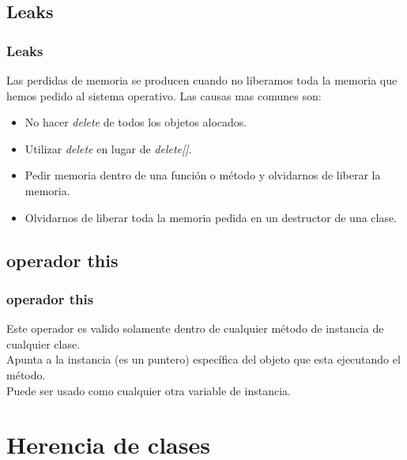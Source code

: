 \documentclass{beamer}
\begin{document}
\subsection{Leaks}
\begin{frame}
\frametitle{Leaks}

Las perdidas de memoria se producen cuando no liberamos toda la memoria que hemos pedido al sistema operativo. Las causas mas comunes son:
\begin{itemize}
 \item No hacer \emph{delete} de todos los objetos alocados.
 \item Utilizar \emph{delete} en lugar de \emph{delete[]}.
 \item Pedir memoria dentro de una función o método y olvidarnos de liberar la memoria.
 \item Olvidarnos de liberar toda la memoria pedida en un destructor de una clase.
\end{itemize}

\end{frame}

\subsection{operador this}
\begin{frame}
\frametitle{operador this}
  Este operador es valido solamente dentro de cualquier método de instancia de cualquier clase. \\ 
  Apunta a la instancia (es un puntero) específica del objeto que esta ejecutando el método. \\
  Puede ser usado como cualquier otra variable de instancia.

\end{frame}

\section{Herencia de clases}
\end{document}
